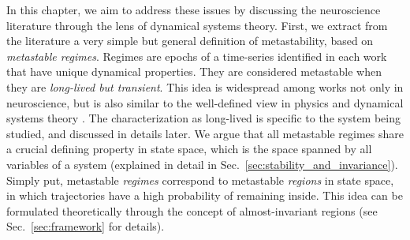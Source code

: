 In this chapter, we aim to address these issues by discussing the neuroscience literature through the lens of dynamical systems theory. First, we extract from the literature a very simple but general definition of metastability, based on \textit{metastable regimes}. Regimes are epochs of a time-series identified in each work that have unique dynamical properties. They are considered metastable when they are \textit{long-lived but transient}. This idea is widespread among works not only in neuroscience, but is also similar to the well-defined view in physics and dynamical systems theory \cite{olivieri2005large, callen1991thermodynamics, yorke1979metastable}. The characterization as long-lived is specific to the system being studied, and discussed in details later. We argue that all metastable regimes share a crucial defining property in state space, which is the space spanned by all variables of a system (explained in detail in Sec.~\ref{sec:stability_and_invariance}). Simply put, metastable \textit{regimes} correspond to metastable \textit{regions} in state space, in which trajectories have a high probability of remaining inside. This idea can be formulated theoretically through the concept of almost-invariant regions \cite{froyland2005statistically, dellnitz2003congestion} (see Sec.~\ref{sec:framework} for details). 

